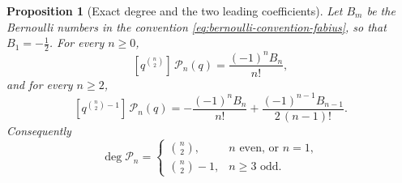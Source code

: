 \documentclass[11pt,oneside,openany]{book}
\newtheorem{proposition}[proposition]{Proposition}
\theoremstyle{definition}
\theoremstyle{remark}
\begin{document}
\begin{proposition}[Exact degree and the two leading coefficients]\label{prop:qF-P-degree-sharp}
Let $B_m$ be the Bernoulli numbers in the convention
\eqref{eq:bernoulli-convention-fabius}, so that $B_1=-\tfrac12$.  For every
$n\ge0$,
\begin{equation}\label{eq:qF-P-leading}
 [q^{\binom n2}]\,\mathcal P_n(q)=\frac{(-1)^nB_n}{n!},
\end{equation}
and for every $n\ge2$,
\begin{equation}\label{eq:qF-P-subleading}
 [q^{\binom n2-1}]\,\mathcal P_n(q)
 =-\frac{(-1)^nB_n}{n!}+\frac{(-1)^{n-1}B_{n-1}}{2\,(n-1)!}.
\end{equation}
Consequently
\begin{equation}\label{eq:qF-P-exact-degree}
 \deg\mathcal P_n=
 \begin{cases}
  \binom n2, & n\text{ even, or }n=1,\\[2pt]
  \binom n2-1, & n\ge3\text{ odd.}
 \end{cases}
\end{equation}
\end{proposition}
\end{document}
